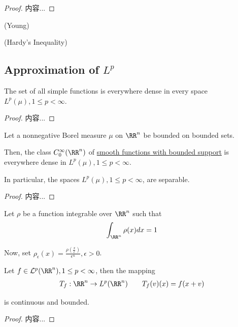 \documentclass[Total.tex]{subfiles}
\begin{document}
	\begin{proof}
		内容...
	\end{proof}
	
	\begin{theorem}
		(Young)
	\end{theorem}
	
	\begin{theorem}
		(Hardy's Inequality)
	\end{theorem}
	
	\subsection{Approximation of $L^p$}
		
		\begin{lemma}
			The set of all simple functions is everywhere dense in every space $L^p(\mu),1\leq p<\infty$. 
		\end{lemma}
		\begin{proof}
			内容...
		\end{proof}
		
		\begin{corollary}
			Let a nonnegative Borel measure $\mu$ on $\RR^n$ be bounded on bounded sets.
			
			Then, the class $C_0^\infty(\RR^n)$ of \underline{smooth functions with bounded support} is everywhere dense in $L^p(\mu),1\leq p<\infty$. 
			
			In particular, the spaces $L^p(\mu),1\leq p<\infty$, are separable.
		\end{corollary}
		\begin{proof}
			内容...
		\end{proof}
		
		\begin{Def}
			Let $\rho$ be a function integrable over $\RR^n$ such that
			\begin{gather*}
				\int_{\RR^n} \rho(x)dx=1
			\end{gather*}
			
			Now, set $\rho_\epsilon(x)=\frac{\rho(\frac{x}{\epsilon})}{\epsilon^n},\epsilon>0$. 
		\end{Def}
		
		\begin{lemma}
			Let $f\in \mathcal{L}^p(\RR^n),1\leq p<\infty$, then the mapping
			\begin{gather*}
				T_f:\RR^n\rightarrow L^p(\RR^n)\qquad T_f(v)(x)=f(x+v)
			\end{gather*}
			
			is continuous and bounded.
		\end{lemma}
		\begin{proof}
			内容...
		\end{proof}
		
\end{document}
